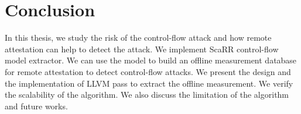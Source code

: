 
\chapter{Conclusion} %

\label{Chapter7} %

In this thesis, we study the risk of the control-flow attack and how remote
attestation can help to detect the attack. We implement ScaRR control-flow model
extractor. We can use the model to build an offline measurement database for
remote attestation to detect control-flow attacks. We present the design and the
implementation of LLVM pass to extract the offline measurement. We verify the
scalability of the algorithm. We also discuss the limitation of the algorithm
and future works.
